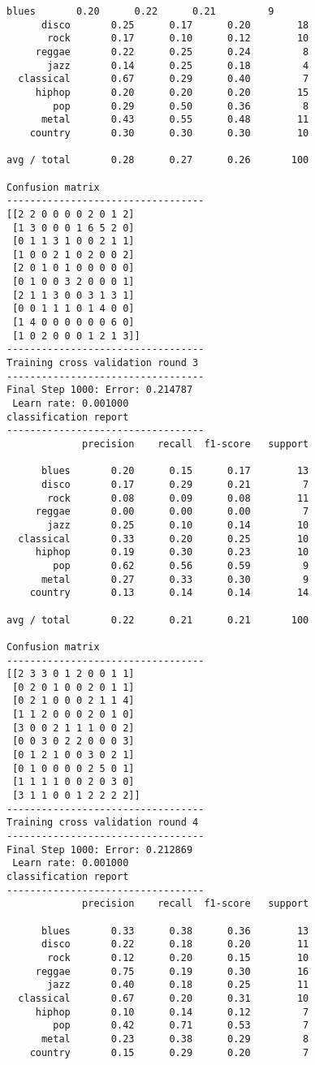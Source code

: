 \documentclass{article}
\begin{document}
\begin{Verbatim}[commandchars=\\\{\}]
      blues       0.20      0.22      0.21         9
      disco       0.25      0.17      0.20        18
       rock       0.17      0.10      0.12        10
     reggae       0.22      0.25      0.24         8
       jazz       0.14      0.25      0.18         4
  classical       0.67      0.29      0.40         7
     hiphop       0.20      0.20      0.20        15
        pop       0.29      0.50      0.36         8
      metal       0.43      0.55      0.48        11
    country       0.30      0.30      0.30        10

avg / total       0.28      0.27      0.26       100

Confusion matrix
----------------------------------
[[2 2 0 0 0 0 2 0 1 2]
 [1 3 0 0 0 1 6 5 2 0]
 [0 1 1 3 1 0 0 2 1 1]
 [1 0 0 2 1 0 2 0 0 2]
 [2 0 1 0 1 0 0 0 0 0]
 [0 1 0 0 3 2 0 0 0 1]
 [2 1 1 3 0 0 3 1 3 1]
 [0 0 1 1 1 0 1 4 0 0]
 [1 4 0 0 0 0 0 0 6 0]
 [1 0 2 0 0 0 1 2 1 3]]
----------------------------------
Training cross validation round 3
----------------------------------
Final Step 1000: Error: 0.214787 
 Learn rate: 0.001000
classification report 
----------------------------------
             precision    recall  f1-score   support

      blues       0.20      0.15      0.17        13
      disco       0.17      0.29      0.21         7
       rock       0.08      0.09      0.08        11
     reggae       0.00      0.00      0.00         7
       jazz       0.25      0.10      0.14        10
  classical       0.33      0.20      0.25        10
     hiphop       0.19      0.30      0.23        10
        pop       0.62      0.56      0.59         9
      metal       0.27      0.33      0.30         9
    country       0.13      0.14      0.14        14

avg / total       0.22      0.21      0.21       100

Confusion matrix
----------------------------------
[[2 3 3 0 1 2 0 0 1 1]
 [0 2 0 1 0 0 2 0 1 1]
 [0 2 1 0 0 0 2 1 1 4]
 [1 1 2 0 0 0 2 0 1 0]
 [3 0 0 2 1 1 1 0 0 2]
 [0 0 3 0 2 2 0 0 0 3]
 [0 1 2 1 0 0 3 0 2 1]
 [0 1 0 0 0 0 2 5 0 1]
 [1 1 1 1 0 0 2 0 3 0]
 [3 1 1 0 0 1 2 2 2 2]]
----------------------------------
Training cross validation round 4
----------------------------------
Final Step 1000: Error: 0.212869 
 Learn rate: 0.001000
classification report 
----------------------------------
             precision    recall  f1-score   support

      blues       0.33      0.38      0.36        13
      disco       0.22      0.18      0.20        11
       rock       0.12      0.20      0.15        10
     reggae       0.75      0.19      0.30        16
       jazz       0.40      0.18      0.25        11
  classical       0.67      0.20      0.31        10
     hiphop       0.10      0.14      0.12         7
        pop       0.42      0.71      0.53         7
      metal       0.23      0.38      0.29         8
    country       0.15      0.29      0.20         7


\end{Verbatim}
\end{document}
